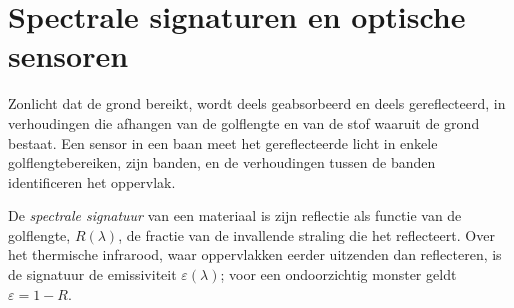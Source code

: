 \section{Spectrale signaturen en optische sensoren}\label{sec:b3:remote-sensing-gis:optical}

Zonlicht dat de grond bereikt, wordt deels geabsorbeerd en deels
gereflecteerd, in verhoudingen die afhangen van de golflengte en van de stof waaruit de grond bestaat.
Een sensor in een baan meet het gereflecteerde licht in enkele
golflengtebereiken, zijn banden, en de verhoudingen tussen de banden
identificeren het oppervlak.

\begin{definition}\label{def:b3:remote-sensing-gis:signature}
De \emph{spectrale signatuur} van een materiaal is
zijn reflectie als functie van de golflengte, $R(\lambda)$, de fractie van de
invallende straling die het reflecteert. Over het thermische infrarood, waar
oppervlakken eerder uitzenden dan reflecteren, is de signatuur de
emissiviteit $\varepsilon(\lambda)$; voor een ondoorzichtig monster geldt $\varepsilon = 1 - R$.
\end{definition}

